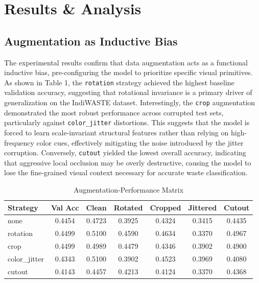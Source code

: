 \documentclass[12pt,a4paper]{article}
\begin{document}
\section{Results \& Analysis}

\vspace{1.5em}

\subsection{Augmentation as Inductive Bias}
The experimental results confirm that data augmentation acts as a functional inductive bias, pre-configuring the model to prioritize specific visual primitives. As shown in Table 1, the \texttt{rotation} strategy achieved the highest baseline validation accuracy, suggesting that rotational invariance is a primary driver of generalization on the IndiWASTE dataset. Interestingly, the \texttt{crop} augmentation demonstrated the most robust performance across corrupted test sets, particularly against \texttt{color\_jitter} distortions. This suggests that the model is forced to learn scale-invariant structural features rather than relying on high-frequency color cues, effectively mitigating the noise introduced by the jitter corruption. Conversely, \texttt{cutout} yielded the lowest overall accuracy, indicating that aggressive local occlusion may be overly destructive, causing the model to lose the fine-grained visual context necessary for accurate waste classification.

\vspace{0.8em}

\begin{table}[H]
\centering
\caption{Augmentation-Performance Matrix}
\begin{tabular}{lcccccc}
\toprule
Strategy & Val Acc & Clean & Rotated & Cropped & Jittered & Cutout \\
\midrule
none & 0.4454 & 0.4723 & 0.3925 & 0.4324 & 0.3415 & 0.4435 \\
rotation & 0.4499 & 0.5100 & 0.4590 & 0.4634 & 0.3370 & 0.4967 \\
crop & 0.4499 & 0.4989 & 0.4479 & 0.4346 & 0.3902 & 0.4900 \\
color\_jitter & 0.4343 & 0.5100 & 0.3902 & 0.4523 & 0.3969 & 0.4080 \\
cutout & 0.4143 & 0.4457 & 0.4213 & 0.4124 & 0.3370 & 0.4368 \\
\bottomrule
\end{tabular}
\end{table}
\end{document}
